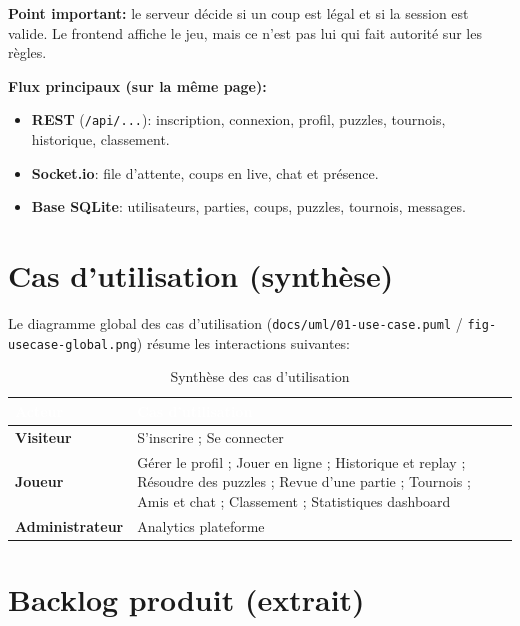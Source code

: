 \documentclass[12pt,a4paper,oneside]{article}
\begin{document}
\noindent\textbf{Point important:} le serveur décide si un coup est légal et si la session est valide.
Le frontend affiche le jeu, mais ce n'est pas lui qui fait autorité sur les règles.

\noindent\textbf{Flux principaux (sur la même page):}
\begin{itemize}
  \item \textbf{REST} (\texttt{/api/...}): inscription, connexion, profil, puzzles, tournois, historique, classement.
  \item \textbf{Socket.io}: file d'attente, coups en live, chat et présence.
  \item \textbf{Base SQLite}: utilisateurs, parties, coups, puzzles, tournois, messages.
\end{itemize}

\section{Cas d'utilisation (synthèse)}

Le diagramme global des cas d'utilisation (\texttt{docs/uml/01-use-case.puml} / \texttt{fig-usecase-global.png}) résume les interactions suivantes:

\begin{table}[H]
\centering
\caption{Synthèse des cas d'utilisation}
\begin{tabularx}{\linewidth}{|>{\bfseries}l|X|}
\hline
\rowcolor{sectionblue}
\textcolor{white}{Acteur} & \textcolor{white}{\textbf{Cas d'utilisation}} \\
\hline
Visiteur & S'inscrire ; Se connecter \\
\hline
Joueur & Gérer le profil ; Jouer en ligne ; Historique et replay ; Résoudre des puzzles ; Revue d'une partie ; Tournois ; Amis et chat ; Classement ; Statistiques dashboard \\
\hline
Administrateur & Analytics plateforme \\
\hline
\end{tabularx}
\end{table}

\section{Backlog produit (extrait)}
\end{document}

